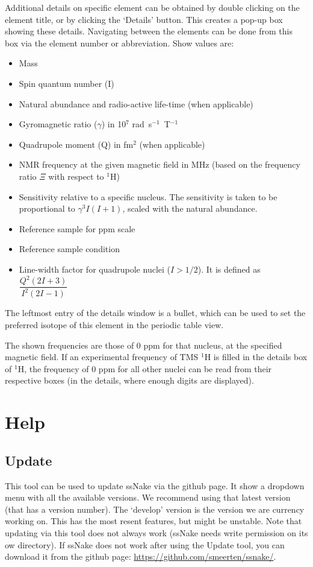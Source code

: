 \documentclass[11pt,a4paper]{article}
\begin{document}
Additional details on specific element can be obtained by double clicking on the element title, or
by clicking the `Details' button. This
creates a pop-up box showing these details. Navigating between the elements can be done from this
box via the element number or abbreviation. Show values are: \begin{itemize}
\item Mass
\item Spin quantum number (I)
\item Natural abundance and radio-active life-time (when applicable)
\item Gyromagnetic ratio ($\gamma$) in 10$^7$ rad~s$^{-1}$~T$^{-1}$
\item Quadrupole moment (Q) in fm$^2$ (when applicable)
\item NMR frequency at the given magnetic field in MHz (based on the frequency ratio $\Xi$ with
  respect to $^1$H)
\item Sensitivity relative to a specific nucleus. The sensitivity is taken to be proportional to $\gamma^3 I (I+1)$, scaled with the natural abundance.
\item Reference sample for ppm scale
\item Reference sample condition
\item Line-width factor for quadrupole nuclei ($I > 1/2$). It is defined as $\dfrac{Q^2(2I+3)}{I^2(2I-1)}$
\end{itemize}
The leftmost entry of the details window is a bullet, which can be used to set the preferred isotope
of this element in the periodic table view.

The shown frequencies are those of 0 ppm for that nucleus, at the specified magnetic field. If an
experimental frequency of TMS $^1$H is filled in the details box of $^1$H, the frequency of 0 ppm for all
other nuclei can be read from their respective boxes (in the details, where enough digits are
displayed). 






\section{Help}
\subsection{Update}
This tool can be used to update ssNake via the github page. It show a dropdown menu with all the available
versions. We recommend using that latest version (that has a version number). The `develop' version is the
version we are currency working on. This has the most resent features, but might be unstable. Note that updating via
this tool does not always work (ssNake needs write permission on its ow directory). If ssNake does not work
after using the Update tool, you can download it from the github page:
\url{https://github.com/smeerten/ssnake/}.
\end{document}
